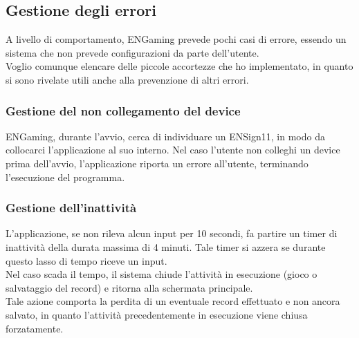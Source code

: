 \subsection{Gestione degli errori}
A livello di comportamento, ENGaming prevede pochi casi di errore, essendo un sistema che non prevede configurazioni da parte dell'utente.\\
Voglio comunque elencare delle piccole accortezze che ho implementato, in quanto si sono rivelate utili anche alla prevenzione di altri errori.
\subsubsection{Gestione del non collegamento del device}
ENGaming, durante l'avvio, cerca di individuare un ENSign11, in modo da collocarci l'applicazione al suo interno. Nel caso l'utente non colleghi un device prima dell'avvio, l'applicazione riporta un errore all'utente, terminando l'esecuzione del programma.
\subsubsection{Gestione dell'inattività}
\label{sec:inactivity}
L'applicazione, se non rileva alcun input per 10 secondi, fa partire un timer di inattività della durata massima di 4 minuti. Tale timer si azzera se durante questo lasso di tempo riceve un input.\\
Nel caso scada il tempo, il sistema chiude l'attività in esecuzione (gioco o salvataggio del record) e ritorna alla schermata principale.\\
Tale azione comporta la perdita di un eventuale record effettuato e non ancora salvato, in quanto l'attività precedentemente in esecuzione viene chiusa forzatamente.